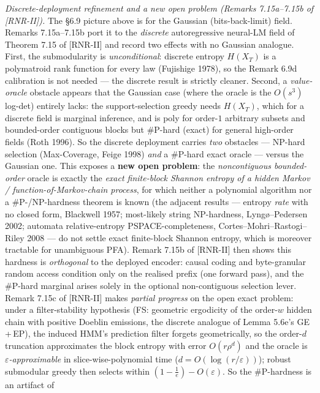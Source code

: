 \documentclass[
]{article}
\begin{document}
\emph{Discrete-deployment refinement and a new open problem (Remarks
7.15a--7.15b of [RNR-II]).} The §6.9 picture above is for the Gaussian (bits-back-limit)
field. Remarks 7.15a--7.15b port it to the \emph{discrete} autoregressive
neural-LM field of Theorem 7.15 of [RNR-II] and record two effects with no Gaussian
analogue. First, the submodularity is \emph{unconditional}: discrete entropy
$H(X_T)$ is a polymatroid rank function for every law (Fujishige 1978), so the
Remark 6.9d calibration is not needed --- the discrete result is strictly
cleaner. Second, a \emph{value-oracle} obstacle appears that the Gaussian case
(where the oracle is the $O(s^3)$ log-det) entirely lacks: the support-selection
greedy needs $H(X_T)$, which for a discrete field is marginal inference, and is
poly for order-$1$ arbitrary subsets and bounded-order contiguous blocks but
\#P-hard (exact) for general high-order fields (Roth 1996). So the discrete
deployment carries \emph{two} obstacles --- NP-hard selection (Max-Coverage,
Feige 1998) \emph{and} a \#P-hard exact oracle --- versus the Gaussian one. This
exposes a \textbf{new open problem}: the \emph{noncontiguous bounded-order}
oracle is exactly the \emph{exact finite-block Shannon entropy of a hidden
Markov / function-of-Markov-chain process}, for which neither a polynomial
algorithm nor a \#P-/NP-hardness theorem is known (the adjacent results ---
entropy \emph{rate} with no closed form, Blackwell 1957; most-likely string
NP-hardness, Lyng\o{}--Pedersen 2002; automata relative-entropy
PSPACE-completeness, Cortes--Mohri--Rastogi--Riley 2008 --- do not settle exact
finite-block Shannon entropy, which is moreover tractable for unambiguous PFA).
Remark 7.15b of [RNR-II] then shows this hardness is \emph{orthogonal} to the deployed
encoder: causal coding and byte-granular random access condition only on the
realised prefix (one forward pass), and the \#P-hard marginal arises solely in
the optional non-contiguous selection lever. Remark 7.15c of [RNR-II] makes \emph{partial
progress} on the open exact problem: under a filter-stability hypothesis (FS:
geometric ergodicity of the order-$w$ hidden chain with positive Doeblin
emissions, the discrete analogue of Lemma 5.6e's GE\,+\,EP), the induced HMM's
prediction filter forgets geometrically, so the order-$d$ truncation
approximates the block entropy with error $O(r\rho^d)$ and the oracle is
\emph{$\varepsilon$-approximable} in slice-wise-polynomial time
($d=O(\log(r/\varepsilon))$); robust submodular greedy then selects within
$(1-\tfrac1e)-O(\varepsilon)$. So the \#P-hardness is an artifact of
\end{document}
